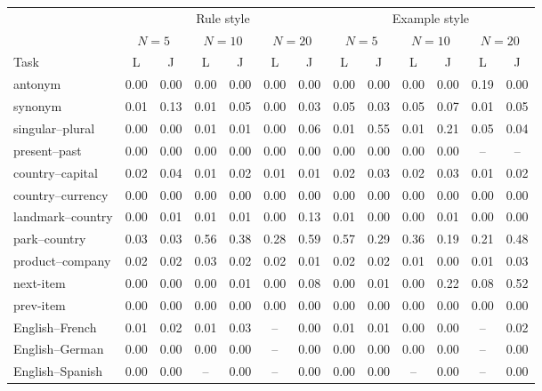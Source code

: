\begin{tabular}{@{}lcccccccccccc@{}}
\toprule
 & \multicolumn{6}{c}{Rule style} & \multicolumn{6}{c}{Example style} \\
\cmidrule(lr){2-7}\cmidrule(lr){8-13}
 & \multicolumn{2}{c}{$N=5$} & \multicolumn{2}{c}{$N=10$} & \multicolumn{2}{c}{$N=20$} & \multicolumn{2}{c}{$N=5$} & \multicolumn{2}{c}{$N=10$} & \multicolumn{2}{c}{$N=20$} \\
\cmidrule(lr){2-3}\cmidrule(lr){4-5}\cmidrule(lr){6-7}\cmidrule(lr){8-9}\cmidrule(lr){10-11}\cmidrule(lr){12-13}
Task & L & J & L & J & L & J & L & J & L & J & L & J \\
\midrule
antonym & 0.00 & 0.00 & 0.00 & 0.00 & 0.00 & 0.00 & 0.00 & 0.00 & 0.00 & 0.00 & 0.19 & 0.00 \\
synonym & 0.01 & 0.13 & 0.01 & 0.05 & 0.00 & 0.03 & 0.05 & 0.03 & 0.05 & 0.07 & 0.01 & 0.05 \\
singular--plural & 0.00 & 0.00 & 0.01 & 0.01 & 0.00 & 0.06 & 0.01 & 0.55 & 0.01 & 0.21 & 0.05 & 0.04 \\
present--past & 0.00 & 0.00 & 0.00 & 0.00 & 0.00 & 0.00 & 0.00 & 0.00 & 0.00 & 0.00 & -- & -- \\
country--capital & 0.02 & 0.04 & 0.01 & 0.02 & 0.01 & 0.01 & 0.02 & 0.03 & 0.02 & 0.03 & 0.01 & 0.02 \\
country--currency & 0.00 & 0.00 & 0.00 & 0.00 & 0.00 & 0.00 & 0.00 & 0.00 & 0.00 & 0.00 & 0.00 & 0.00 \\
landmark--country & 0.00 & 0.01 & 0.01 & 0.01 & 0.00 & 0.13 & 0.01 & 0.00 & 0.00 & 0.01 & 0.00 & 0.00 \\
park--country & 0.03 & 0.03 & 0.56 & 0.38 & 0.28 & 0.59 & 0.57 & 0.29 & 0.36 & 0.19 & 0.21 & 0.48 \\
product--company & 0.02 & 0.02 & 0.03 & 0.02 & 0.02 & 0.01 & 0.02 & 0.02 & 0.01 & 0.00 & 0.01 & 0.03 \\
next-item & 0.00 & 0.00 & 0.00 & 0.01 & 0.00 & 0.08 & 0.00 & 0.01 & 0.00 & 0.22 & 0.08 & 0.52 \\
prev-item & 0.00 & 0.00 & 0.00 & 0.00 & 0.00 & 0.00 & 0.00 & 0.00 & 0.00 & 0.00 & 0.00 & 0.00 \\
English--French & 0.01 & 0.02 & 0.01 & 0.03 & -- & 0.00 & 0.01 & 0.01 & 0.00 & 0.00 & -- & 0.02 \\
English--German & 0.00 & 0.00 & 0.00 & 0.00 & -- & 0.00 & 0.00 & 0.00 & 0.00 & 0.00 & -- & 0.00 \\
English--Spanish & 0.00 & 0.00 & -- & 0.00 & -- & 0.00 & 0.00 & 0.00 & -- & 0.00 & -- & 0.00 \\
\bottomrule
\end{tabular}

